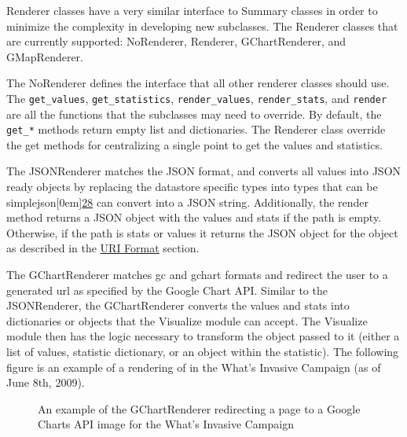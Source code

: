 \documentclass[10pt,a4paper,english]{article}
\begin{document}
Renderer classes have a very similar interface to Summary classes in order to minimize the complexity in developing new subclasses. The Renderer classes that are currently supported: NoRenderer, Renderer, GChartRenderer, and GMapRenderer.

The NoRenderer defines the interface that all other renderer classes should use. The \texttt{get{\_}values}, \texttt{get{\_}statistics}, \texttt{render{\_}values}, \texttt{render{\_}stats}, and \texttt{render} are all the functions that the subclasses may need to override. By default, the \texttt{get{\_}*} methods return empty list and dictionaries. The Renderer class override the get methods for centralizing a single point to get the values and statistics.

The JSONRenderer matches the JSON format, and converts all values into JSON ready objects by replacing the datastore specific types into types that can be simplejson\raisebox{.5em}[0em]{\scriptsize\hyperlink{id59}{28}} can convert into a JSON string. Additionally, the render method returns a JSON object with the values and stats if the path is empty. Otherwise, if the path is stats or values it returns the JSON object for the object as described in the \href{\#uri-format}{URI Format} section.

The GChartRenderer matches gc and gchart formats and redirect the user to a generated url as specified by the Google Chart API. Similar to the JSONRenderer, the GChartRenderer converts the values and stats into dictionaries or objects that the Visualize module can accept. The Visualize module then has the logic necessary to transform the object passed to it (either a list of values, statistic dictionary, or an object within the statistic). The following figure is an example of a rendering of in the What's Invasive Campaign (as of June 8th, 2009).
\begin{figure}[htbp]
\centering

\caption{An example of the GChartRenderer redirecting a page to a Google Charts API image for the What's Invasive Campaign}\end{figure}
\end{document}
